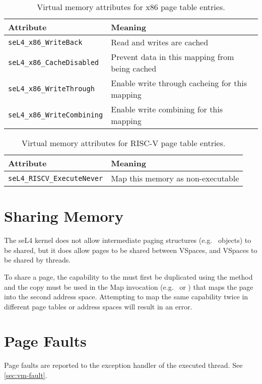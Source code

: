 \begin{table}[htb]
  \begin{center}
    \begin{tabularx}{\textwidth}{p{}X}
      \toprule
      Attribute & Meaning \\
      \midrule
      \texttt{seL4\_x86\_WriteBack} & Read and writes are cached \\
      \texttt{seL4\_x86\_CacheDisabled} & Prevent data in this mapping
      from being cached \\
      \texttt{seL4\_x86\_WriteThrough} & Enable write through cacheing for this mapping \\
      \texttt{seL4\_x86\_WriteCombining} & Enable write combining for this mapping \\
      \bottomrule
    \end{tabularx}
    \caption{\label{tbl:vmattr_x86} Virtual memory attributes for x86 page
      table entries.}
  \end{center}
\end{table}

\begin{table}[htb]
  \begin{center}
    \begin{tabularx}{\textwidth}{p{}X}
      \toprule
      Attribute & Meaning \\
      \midrule
      \texttt{seL4\_RISCV\_ExecuteNever} & Map this memory as non-executable \\
      \bottomrule
    \end{tabularx}
    \caption{\label{tbl:vmattr_riscv} Virtual memory attributes for RISC-V page
      table entries.}
  \end{center}
\end{table}

\section{Sharing Memory}

The seL4 kernel does not allow intermediate paging structures (e.g.\  objects) to be
shared, but it does allow pages to be shared between VSpaces, and VSpaces to be shared by threads.

To share a page, the capability to the  must first be duplicated using the
 method and the copy must be used in the Map invocation
(e.g.\  \ifxeightsix or
\fi) that maps the page into the second address space.
Attempting to map the same capability twice in different page tables or address spaces will result
in an error.


\section{Page Faults}

Page faults are reported to the exception handler of the executed thread.
See \autoref{sec:vm-fault}.
